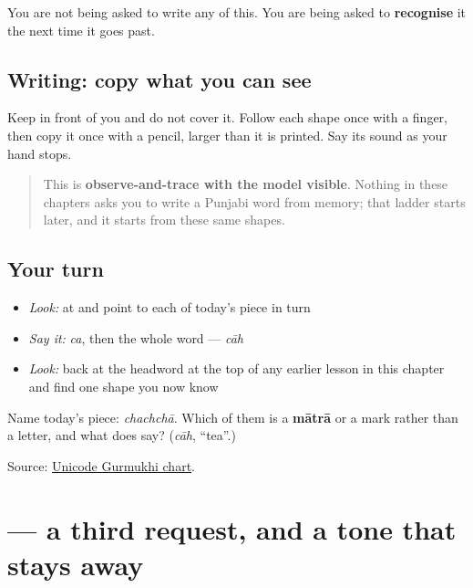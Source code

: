 You are not being asked to write any of this. You are being asked to \textbf{recognise} it the next time it goes past.

\subsection*{Writing: copy what you can see}

Keep  in front of you and do not cover it. Follow each shape once with a finger, then copy it once with a pencil, larger than it is printed. Say its sound as your hand stops.

\begin{quote}
This is \textbf{observe-and-trace with the model visible}. Nothing in these chapters asks you to write a Punjabi word from memory; that ladder starts later, and it starts from these same shapes.
\end{quote}

\subsection*{Your turn}
\begin{itemize}
\raggedright
  \item \emph{Look:} at \textbf{} and point to each of today's piece in turn
  \item \emph{Say it:} \emph{ca}, then the whole word — \emph{cāh}
  \item \emph{Look:} back at the headword at the top of any earlier lesson in this chapter and find one shape you now know
\end{itemize}

\begin{tcolorbox}[breakable,colback=teal!4,colframe=teal!35!black,title={Before you move on}]
Name today's piece: \emph{chachchā}. Which of them is a \textbf{mātrā} or a mark rather than a letter, and what does \textbf{} say? (\emph{cāh}, “tea”.)

Source: \href{https://www.unicode.org/charts/PDF/U0A00.pdf}{Unicode Gurmukhi chart}.
\end{tcolorbox}
\section[\texorpdfstring{\pa{ਦੁੱਧ} (dudh)}{ਦੁੱਧ (dudh)}]{ — a third request, and a tone that stays away}

